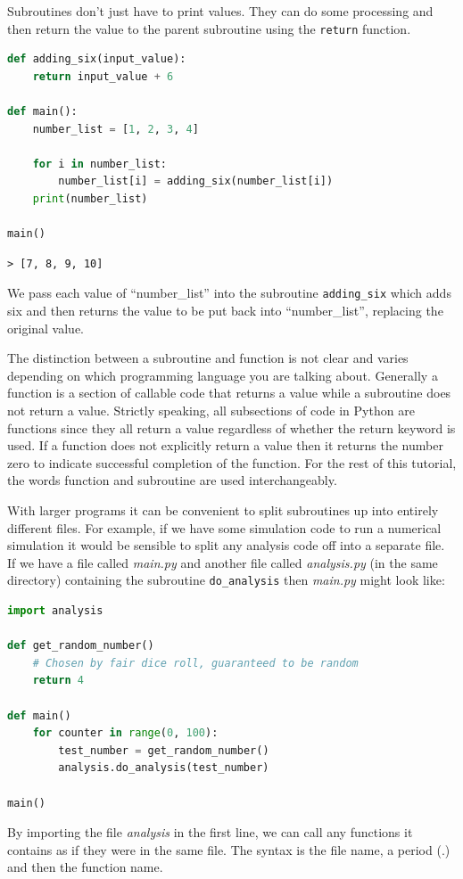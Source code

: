 				Subroutines don't just have to print values. They can do some processing and then return the value to the parent subroutine using the \texttt{return} function.

			\begin{lstlisting}[language=Python]
def adding_six(input_value):
	return input_value + 6

def main():
	number_list = [1, 2, 3, 4]
	
	for i in number_list:
		number_list[i] = adding_six(number_list[i])
	print(number_list)
			
main()\end{lstlisting}

			\begin{verbatim}> [7, 8, 9, 10]\end{verbatim}
			We pass each value of ``number\_list'' into the subroutine \texttt{adding\_six} which adds six and then returns the value to be put back into ``number\_list'', replacing the original value. 

			The distinction between a subroutine and function is not clear and varies depending on which programming language you are talking about. Generally a function is a section of callable code that returns a value while a subroutine does not return a value. Strictly speaking, all subsections of code in Python are functions since they all return a value regardless of whether the return keyword is used. If a function does not explicitly return a value then it returns the number zero to indicate successful completion of the function. For the rest of this tutorial, the words function and subroutine are used interchangeably.

			With larger programs it can be convenient to split subroutines up into entirely different files. For example, if we have some simulation code to run a numerical simulation it would be sensible to split any analysis code off into a separate file. If we have a file called \textit{main.py} and another file called \textit{analysis.py} (in the same directory) containing the subroutine \texttt{do\_analysis} then \textit{main.py} might look like:
\begin{lstlisting}[language=Python]
import analysis

def get_random_number()
	# Chosen by fair dice roll, guaranteed to be random
	return 4
	
def main()
	for counter in range(0, 100):
		test_number = get_random_number()
		analysis.do_analysis(test_number)
			
main()\end{lstlisting}
By importing the file \textit{analysis} in the first line, we can call any functions it contains as if they were in the same file. The syntax is the file name, a period (.) and then the function name.

